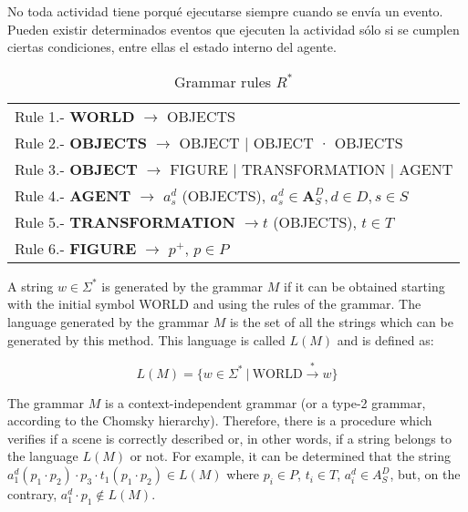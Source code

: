 \documentclass[runningheads]{llncs}
\begin{document}
No toda actividad tiene porqué ejecutarse siempre cuando se envía un evento. Pueden existir determinados eventos que ejecuten la actividad sólo si se cumplen ciertas condiciones, entre ellas el estado interno del agente.
	
\begin{table}[h]
\begin{center}
\begin{tabular}{|l|}
    \hline

    Rule 1.- \textbf{WORLD} $\rightarrow$ OBJECTS \\

    Rule 2.- \textbf{OBJECTS} $\rightarrow$ OBJECT $|$ OBJECT · OBJECTS \\

    Rule 3.- \textbf{OBJECT} $\rightarrow$ FIGURE $|$ TRANSFORMATION $|$ AGENT \\

    Rule 4.- \textbf{AGENT} $\rightarrow$ $a^d_s$ (OBJECTS), $a^d_s \in \textbf{A}^D_S, d \in D, s \in S$ \\

    Rule 5.- \textbf{TRANSFORMATION} $\rightarrow t$ (OBJECTS), $t \in T$ \\

    Rule 6.- \textbf{FIGURE} $\rightarrow$ $p^+$, $p \in P$ \\

    \hline
\end{tabular}
\end{center}
\label{tab:rules}
\caption{Grammar rules $R^*$}
\end{table}
	
	
A string $w \in \Sigma^*$ is generated by the grammar $M$ if it can be
obtained starting with the initial symbol WORLD and using the rules of the
grammar. The language generated by the grammar $M$ is the set of all the strings
which can be generated by this method. This language is called $L(M)$ and is
defined as:

\begin{equation}
 L(M) = \lbrace w \in \Sigma^* \ | \ \text{WORLD} \stackrel{*}{\rightarrow} w \rbrace
\end{equation}


The grammar $M$ is a context-independent grammar (or a type-2 grammar, according to the Chomsky
hierarchy). Therefore, there is a procedure which verifies if a scene is correctly described or, in
other words, if a string belongs to the language $L(M)$ or not. For example, it can be determined
that the string $a_1^d ( p_1 \cdot p_2) \cdot p_3 \cdot t_1 ( p_1 \cdot p_2 ) \in L(M)$ where $p_i
\in P$, $t_i \in T$, $a_i^d \in A^D_S$, but, on the contrary, $a_1^d \cdot p_1 \notin L(M)$.
\end{document}
